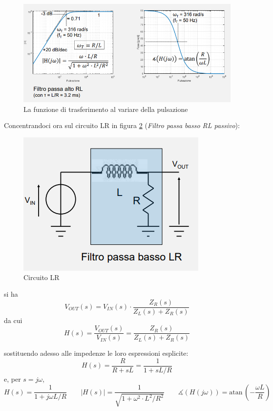 \documentclass{article}
\begin{document}
\begin{figure}[h]
  \centering
  \includegraphics[scale=0.6]{IM_circuito_RL_passivo_grafici}
  \caption{La funzione di trasferimento al variare della pulsazione}
  \label{Schema_circuito_RL_passivo_grafici}
\end{figure}
\clearpage
Concentrandoci ora sul circuito LR in figura \ref{Schema_circuito_LR_passivo} (\textit{Filtro passa basso RL passivo}):

\begin{figure}[h]
  \centering
  \includegraphics[scale=0.55]{IM_circuito_LR_passivo}
  \caption{Circuito LR}
  \label{Schema_circuito_LR_passivo}
\end{figure}

si ha
\[V_{OUT}(s) = V_{IN}(s) \cdot \frac{Z_R(s)}{Z_L(s) + Z_R(s)}\]
da cui 
\[H(s) = \frac{V_{OUT} (s)}{V_{IN} (s)} = \frac{Z_R(s)}{Z_L(s) + Z_R(s)}\]

sostituendo adesso alle impedenze le loro espressioni esplicite:
\[H(s) = \frac{R}{R + sL} = \frac{1}{1 + sL/R}\]
e, per $s = j\omega$, 
\[H(s) = \frac{1}{1 + j \omega L/R} \quad \quad |H(s)| = \frac{1}{\sqrt{1 + \omega ^2 \cdot L^2 / R^2}} \quad \quad \measuredangle (H(j \omega)) = \textrm{atan}\, \left(-\frac{\omega L}{ R}\right)\]
\end{document}
